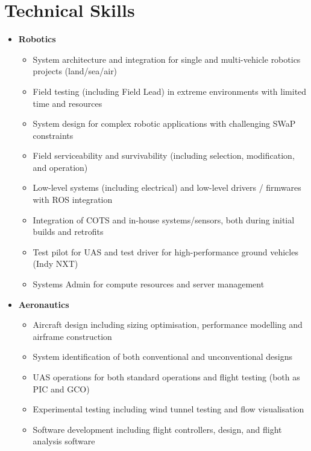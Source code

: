\documentclass[12pt,letter,sans]{moderncv}
\begin{document}
\section{Technical Skills}
\vspace{4pt}

\begin{itemize}
\item
{
    \textbf{Robotics}
        \vspace{3pt} 
        \begin{itemize}
			\item System architecture and integration for single and multi-vehicle robotics projects (land/sea/air)
            \item Field testing (including Field Lead) in extreme environments with limited time and resources
            \item System design for complex robotic applications with challenging SWaP constraints%
            \item Field serviceability and survivability (including selection, modification, and operation)
            \item Low-level systems (including electrical) and low-level drivers / firmwares with ROS integration
            \item Integration of COTS and in-house systems/sensors, both during initial builds and retrofits %
            \item Test pilot for UAS and test driver for high-performance ground vehicles (Indy NXT)
            \item Systems Admin for compute resources and server management
        \end{itemize}
}

\vspace{4pt}

\item
{
    \textbf{Aeronautics}
        \vspace{3pt} 
        \begin{itemize} 
            \item Aircraft design including sizing optimisation, performance modelling and airframe construction
            \item System identification of both conventional and unconventional designs
            \item UAS operations for both standard operations and flight testing (both as PIC and GCO)
            \item Experimental testing including wind tunnel testing and flow visualisation
            \item Software development including flight controllers, design, and flight analysis software
        \end{itemize}
}


\end{itemize}
\end{document}
